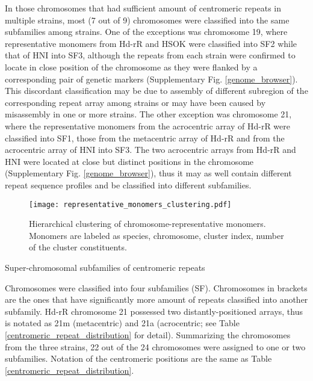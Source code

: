   In those chromosomes that had sufficient amount of centromeric repeats in multiple strains, most (7 out of 9) chromosomes were classified into the same subfamilies among strains. One of the exceptions was chromosome 19, where representative monomers from Hd-rR and HSOK were classified into SF2 while that of HNI into SF3, although the repeats from each strain were confirmed to locate in close position of the chromosome as they were flanked by a corresponding pair of genetic markers (Supplementary Fig. \ref{genome_browser}). This discordant classification may be due to assembly of different subregion of the corresponding repeat array among strains or may have been caused by misassembly in one or more strains. The other exception was chromosome 21, where the representative monomers from the acrocentric array of Hd-rR were classified into SF1, those from the metacentric array of Hd-rR and from the acrocentric array of HNI into SF3. The two acrocentric arrays from Hd-rR and HNI were located at close but distinct positions in the chromosome (Supplementary Fig. \ref{genome_browser}), thus it may as well contain different repeat sequence profiles and be classified into different subfamilies.


  \begin{figure*}
    \centering
    \texttt{[image: representative\_monomers\_clustering.pdf]}
    \caption{
      Hierarchical clustering of chromosome-representative monomers. Monomers are labeled as species, chromosome, cluster index, number of the cluster constituents.
    }
    \label{monomer_clustering}
  \end{figure*}

  \begin{table*}
    \centering
    \caption{Super-chromosomal subfamilies of centromeric repeats}
    
    \label{super_chromosomal_subfamily}
    \caption*{{\small
      Chromosomes were classified into four subfamilies (SF). Chromosomes in brackets are the ones that have significantly more amount of repeats classified into another subfamily. Hd-rR chromosome 21 possessed two distantly-positioned arrays, thus is notated as 21m (metacentric) and 21a (acrocentric; see Table \ref{centromeric_repeat_distribution} for detail). Summarizing the chromosomes from the three strains, 22 out of the 24 chromosomes were assigned to one or two subfamilies. Notation of the centromeric positions are the same as Table \ref{centromeric_repeat_distribution}.
    }}
  \end{table*}
